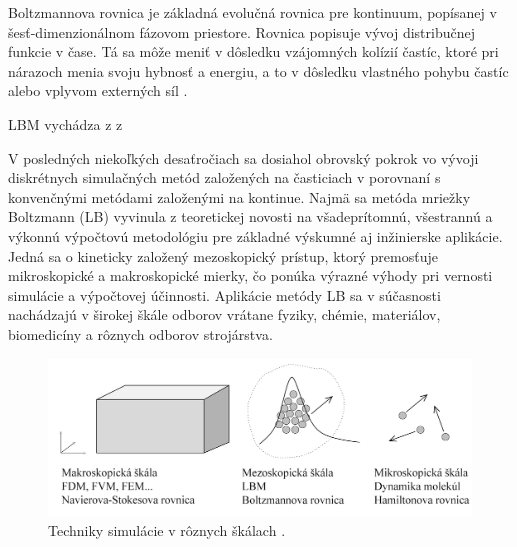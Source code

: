 \documentclass[]{tukediphc}
\begin{document}
\citep{delbosc2015}


Boltzmannova rovnica je základná evolučná rovnica pre kontinuum, popísanej v šesť-dimenzionálnom fázovom priestore. Rovnica popisuje vývoj distribučnej funkcie v čase. Tá sa môže meniť v dôsledku vzájomných kolízií častíc, ktoré pri nárazoch menia svoju hybnosť a energiu, a to v dôsledku vlastného pohybu častíc alebo vplyvom externých síl \citep{HEIDLER2011thesis}.

LBM vychádza z z 


V posledných niekoľkých desaťročiach sa dosiahol obrovský pokrok vo vývoji diskrétnych simulačných metód založených na časticiach v porovnaní s konvenčnými metódami založenými na kontinue. Najmä sa metóda mriežky Boltzmann (LB) vyvinula z teoretickej novosti na všadeprítomnú, všestrannú a výkonnú výpočtovú metodológiu pre základné výskumné aj inžinierske aplikácie. Jedná sa o kineticky založený mezoskopický prístup, ktorý premosťuje mikroskopické a makroskopické mierky, čo ponúka výrazné výhody pri vernosti simulácie a výpočtovej účinnosti. Aplikácie metódy LB sa v súčasnosti nachádzajú v širokej škále odborov vrátane fyziky, chémie, materiálov, biomedicíny a rôznych odborov strojárstva.

\begin{figure}[!ht]
	\centering
	\includegraphics[width=1\textwidth,angle=0]{figures/different-scales.png}
	\caption{Techniky simulácie v rôznych škálach \citep{Mele2013}.}
\end{figure}
\end{document}
